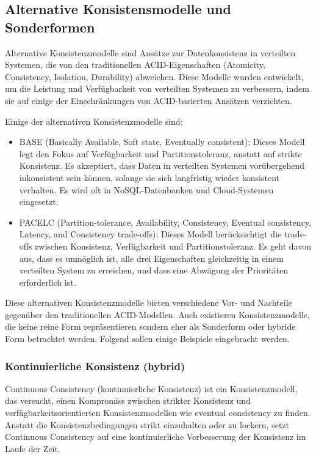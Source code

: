 \documentclass[../vs-script-first-v01.tex]{subfiles}
\begin{document}
\subsection{Alternative Konsistensmodelle und Sonderformen}
Alternative Konsistenzmodelle sind Ansätze zur Datenkonsistenz in verteilten Systemen, die von den traditionellen ACID-Eigenschaften (Atomicity, Consistency, Isolation, Durability) abweichen. Diese Modelle wurden entwickelt, um die Leistung und Verfügbarkeit von verteilten Systemen zu verbessern, indem sie auf einige der Einschränkungen von ACID-basierten Ansätzen verzichten.

Einige der alternativen Konsistenzmodelle sind:
\begin{itemize}
\item BASE (Basically Available, Soft state, Eventually consistent): Dieses Modell legt den Fokus auf Verfügbarkeit und Partitionstoleranz, anstatt auf strikte Konsistenz. Es akzeptiert, dass Daten in verteilten Systemen vorübergehend inkonsistent sein können, solange sie sich langfristig wieder konsistent verhalten. Es wird oft in NoSQL-Datenbanken und Cloud-Systemen eingesetzt.
\item PACELC (Partition-tolerance, Availability, Consistency, Eventual consistency, Latency, and Consistency trade-offs): Dieses Modell berücksichtigt die trade-offs zwischen Konsistenz, Verfügbarkeit und Partitionstoleranz. Es geht davon aus, dass es unmöglich ist, alle drei Eigenschaften gleichzeitig in einem verteilten System zu erreichen, und dass eine Abwägung der Prioritäten erforderlich ist.
\end{itemize}
Diese alternativen Konsistenzmodelle bieten verschiedene Vor- und Nachteile gegenüber den traditionellen ACID-Modellen. Auch existieren Konsistenzmodelle, die keine reine Form repräsentieren sondern eher als Sonderform oder hybride Form betrachtet werden. Folgend sollen einige Beispiele eingebracht werden. 

\subsubsection{Kontinuierliche Konsistenz (hybrid)}
Continuous Consistency (kontinuierliche Konsistenz) ist ein Konsistenzmodell, das versucht, einen Kompromiss zwischen strikter Konsistenz und verfügbarkeitsorientierten Konsistenzmodellen wie eventual consistency zu finden. Anstatt die Konsistenzbedingungen strikt einzuhalten oder zu lockern, setzt Continuous Consistency auf eine kontinuierliche Verbesserung der Konsistenz im Laufe der Zeit.
\end{document}
